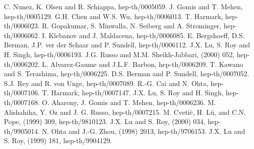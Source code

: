 \documentclass[a4paper,12pt]{article}
\begin{document}
\begin{thebibliography}{99}
 C. Nunez, K. Olsen and R. Schiappa, hep-th/0005059.
 J. Gomis and T. Mehen, hep-th/0005129.
 G.H. Chen and W.S. Wu, hep-th/0006013.
 T. Harmark, hep-th/0006023.
 R. Gopakumar, S. Minwalla, N. Seiberg and A. Strominger,
 hep-th/0006062.
 I. Klebanov and J. Maldacena, hep-th/0006085.
 E. Bergshoeff, D.S. Berman, J.P. ver der Schaar and P.
 Sundell, hep-th/0006112.
 J.X. Lu, S. Roy and H. Singh, hep-th/0006193.
 J.G. Russo and M.M. Sheikh-Jabbari,  (2000) 052,
 hep-th/0006202.
 L. Alvarez-Gaume and J.L.F. Barbon, hep-th/0006209.
 T. Kawano and S. Terashima, hep-th/0006225.
 D.S. Berman and P. Sundell, hep-th/0007052.
 S.J. Rey and R. von Unge, hep-th/0007089.
 R.-G. Cai and N. Ohta, hep-th/0007106.
 T. Harmark, hep-th/0007147.
 J.X. Lu, S. Roy and H. Singh, hep-th/0007168.
 O. Aharony, J. Gomis and T. Mehen, hep-th/0006236.
 M. Alishahiha, Y. Oz and J. G. Russo, hep-th/0007215.
 M. Cveti\u{c}, H. L\"{u}, and C.N. Pope, 
 (1999) 309, hep-th/9810123.
 J.X. Lu and S. Roy,  (2000) 034, hep-th/9905014.
 N. Ohta and J.-G. Zhou,  (1998) 2013, hep-th/9706153.
 J.X. Lu and S. Roy,  (1999) 181, hep-th/9904129.
\end{thebibliography}
\end{document}
